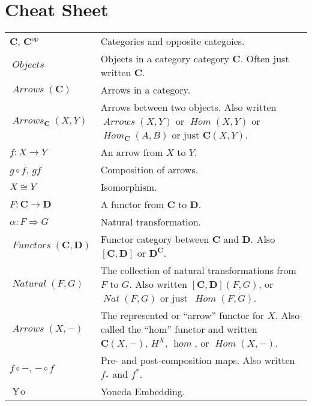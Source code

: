 \documentclass[12pt]{article}
\theoremstyle{definition}
\theoremstyle{definition}
\theoremstyle{definition}
\numberwithin{equation}{section}
\newcommand{\op}{\mathrm{op}}           %
\newcommand{\cat}[1]{\mathbf{#1}}      %
\newcommand{\CC}{\cat{C}}
\newcommand{\DD}{\cat{D}}
\DeclareMathOperator{\Arrows}{\mathit{Arrows}}
\DeclareMathOperator{\Objects}{\mathit{Objects}}
\DeclareMathOperator{\Hom}{\mathit{Hom}}
\DeclareMathOperator{\Nat}{\mathit{Natural}}
\DeclareMathOperator{\Fun}{\mathit{Functors}}
\newcommand{\iso}{\cong}                %
\newcommand{\Yo}{\mathop{Y\!o}}
\newcommand{\fto}{\Rightarrow}
\begin{document}
\section{Cheat Sheet}
\small
\renewcommand{\arraystretch}{1.1}
\begin{tabularx}{.9\linewidth}{l X}
$\CC$, $\CC^\op$ & Categories and opposite categoies. \\
$\Objects$ & Objects in a category category $\CC$. Often just written $\CC$.\\
$\Arrows(\CC)$ & Arrows in a category. \\
$\Arrows_\CC(X,Y)$ & Arrows between two objects.  Also written $\Arrows(X,Y)$ or
$\Hom(X,Y)$ or $\Hom_\CC(A, B)$ or just $\CC(X,Y)$. \\
$f: X \to Y$ & An arrow from $X$ to $Y$.\\
$g \circ f$, $gf$ & Composition of arrows.\\
$X \iso Y$ & Isomorphism.\\
$F:\CC \to\DD$ & A functor from $\CC$ to $\DD$.\\
$\alpha: F \fto G$ & Natural transformation.\\
$\Fun(\CC, \DD)$ & Functor category between $\CC$ and $\DD$. Also $[\CC,\DD]$ or
$\DD^\CC$.\\
$\Nat(F, G)$ & The collection of natural transformations from $F$ to $G$. Also written
$[\CC,\DD](F,G)$, or~$\mathop{\mathit {Nat}}(F,G)$ or just~$\Hom(F,G)$. \\
$\Arrows(X, -)$ & The represented or ``arrow'' functor for $X$. Also called the ``hom''
functor and written $\CC(X,-)$, $H^X$, $\mathop{\mathit{hom}}$, or $\Hom(X,-)$. \\
$f \circ - $, $- \circ f$ & Pre- and post-composition maps. Also written $f_*$ and
$f^*$.\\
$\Yo$ & Yoneda Embedding.\\
\end{tabularx}

\normalsize
\end{document}
